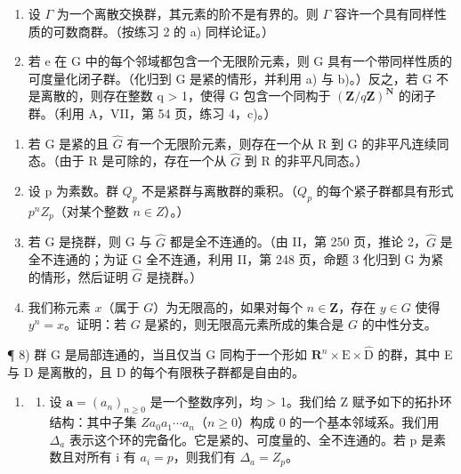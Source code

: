 \begin{enumerate}
\def\labelenumi{\alph{enumi})}
\setcounter{enumi}{1}
\item
  设 \(\Gamma\) 为一个离散交换群，其元素的阶不是有界的。则 \(\Gamma\) 容许一个具有同样性质的可数商群。（按练习 2 的 a) 同样论证。）
\item
  若 e 在 G 中的每个邻域都包含一个无限阶元素，则 G 具有一个带同样性质的可度量化闭子群。（化归到 G 是紧的情形，并利用 a) 与 b)。）反之，若 G 不是离散的，则存在整数 q \textgreater{} 1，使得 G 包含一个同构于 \((\mathbf{Z}/q\mathbf{Z})^{\mathbf{N}}\) 的闭子群。（利用 A，VII，第 54 页，练习 4，c)。）
\end{enumerate}

\begin{enumerate}
\def\labelenumi{\arabic{enumi})}
\setcounter{enumi}{3}
\item
  若 G 是紧的且 \(\widehat{G}\) 有一个无限阶元素，则存在一个从 R 到 G 的非平凡连续同态。（由于 R 是可除的，存在一个从 \(\widehat{G}\) 到 R 的非平凡同态。）
\item
  设 p 为素数。群 \(Q_{p}\) 不是紧群与离散群的乘积。（\(Q_{p}\) 的每个紧子群都具有形式 \(p^{n}Z_{p}\)（对某个整数 \(n \in Z\)）。）
\item
  若 G 是挠群，则 G 与 \(\widehat{G}\) 都是全不连通的。（由 II，第 250 页，推论 2，\(\widehat{G}\) 是全不连通的；为证 G 全不连通，利用 II，第 248 页，命题 3 化归到 G 为紧的情形，然后证明 \(\widehat{G}\) 是挠群。）
\item
  我们称元素 \(x\)（属于 \(G\)）为无限高的，如果对每个 \(n \in \mathbf{Z}\)，存在 \(y \in G\) 使得 \(y^n = x\)。证明：若 \(G\) 是紧的，则无限高元素所成的集合是 \(G\) 的中性分支。
\end{enumerate}

¶ 8) 群 G 是局部连通的，当且仅当 G 同构于一个形如 \(\mathbf{R}^{n}\times\mathrm{E}\times\widehat{\mathrm{D}}\) 的群，其中 E 与 D 是离散的，且 D 的每个有限秩子群都是自由的。

\begin{enumerate}
\def\labelenumi{\arabic{enumi})}
\setcounter{enumi}{8}
\tightlist
\item
  \begin{enumerate}
  \def\labelenumii{\alph{enumii})}
  \tightlist
  \item
    设 \(\boldsymbol{a}=(a_{n})_{n\geqslant0}\) 是一个整数序列，均 \textgreater{} 1。我们给 Z 赋予如下的拓扑环结构：其中子集 \(Za_{0}a_{1}\cdots a_{n}\)（\(n\geqslant0\)）构成 0 的一个基本邻域系。我们用 \(\Delta_{a}\) 表示这个环的完备化。它是紧的、可度量的、全不连通的。若 p 是素数且对所有 i 有 \(a_{i}=p\)，则我们有 \(\Delta_{a}=Z_{p}\)。
  \end{enumerate}
\end{enumerate}

